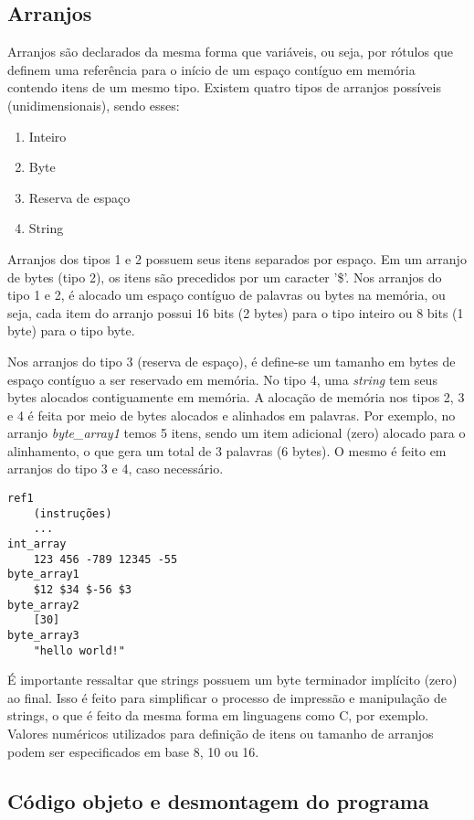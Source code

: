 \documentclass[11pt,a4paper]{report}
\begin{document}
\subsection{Arranjos}

Arranjos são declarados da mesma forma que variáveis, ou seja, por
rótulos que definem uma referência para o início de um espaço contíguo
em memória contendo itens de um mesmo tipo. Existem quatro tipos de
arranjos possíveis (unidimensionais), sendo esses:

\begin{enumerate}
\item Inteiro
\item Byte
\item Reserva de espaço
\item String
\end{enumerate}

Arranjos dos tipos 1 e 2 possuem seus itens separados por espaço. Em
um arranjo de bytes (tipo 2), os itens são precedidos por um caracter
'\$'. Nos arranjos do tipo 1 e 2, é alocado um espaço contíguo de
palavras ou bytes na memória, ou seja, cada item do arranjo possui 16
bits (2 bytes) para o tipo inteiro ou 8 bits (1 byte) para o tipo byte.

Nos arranjos do tipo 3 (reserva de espaço), é define-se um tamanho em
bytes de espaço contíguo a ser reservado em memória. No tipo 4, uma
\textit{string} tem seus bytes alocados contiguamente em memória. A
alocação de memória nos tipos 2, 3 e 4 é feita por meio de bytes alocados
e alinhados em palavras. Por exemplo, no arranjo \textit{byte\_array1}
temos 5 itens, sendo um item adicional (zero) alocado para o alinhamento,
o que gera um total de 3 palavras (6 bytes). O mesmo é feito em arranjos
do tipo 3 e 4, caso necessário.

\begin{verbatim}
ref1
    (instruções)
    ...
int_array
    123 456 -789 12345 -55
byte_array1
    $12 $34 $-56 $3
byte_array2
    [30]
byte_array3
    "hello world!"
\end{verbatim}

É importante ressaltar que strings possuem um byte terminador implícito
(zero) ao final. Isso é feito para simplificar o processo de impressão e
manipulação de strings, o que é feito da mesma forma em linguagens como
C, por exemplo. Valores numéricos utilizados para definição de itens
ou tamanho de arranjos podem ser especificados em base 8, 10 ou 16.

\subsection{Código objeto e desmontagem do programa}
\end{document}
